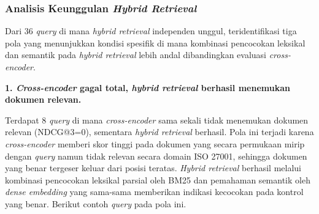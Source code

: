 \subsubsection{Analisis Keunggulan \textit{Hybrid Retrieval}}

Dari 36 \textit{query} di mana \textit{hybrid retrieval} independen unggul, teridentifikasi tiga pola yang menunjukkan kondisi spesifik di mana kombinasi pencocokan leksikal dan semantik pada \textit{hybrid retrieval} lebih andal dibandingkan evaluasi \textit{cross-encoder}.

\textbf{1. \textit{Cross-encoder} gagal total, \textit{hybrid retrieval} berhasil menemukan dokumen relevan.}

Terdapat 8 \textit{query} di mana \textit{cross-encoder} sama sekali tidak menemukan dokumen relevan (NDCG@3=0), sementara \textit{hybrid retrieval} berhasil. Pola ini terjadi karena \textit{cross-encoder} memberi skor tinggi pada dokumen yang secara permukaan mirip dengan \textit{query} namun tidak relevan secara domain ISO 27001, sehingga dokumen yang benar tergeser keluar dari posisi teratas. \textit{Hybrid retrieval} berhasil melalui kombinasi pencocokan leksikal parsial oleh BM25 dan pemahaman semantik oleh \textit{dense embedding} yang sama-sama memberikan indikasi kecocokan pada kontrol yang benar. Berikut contoh \textit{query} pada pola ini.


